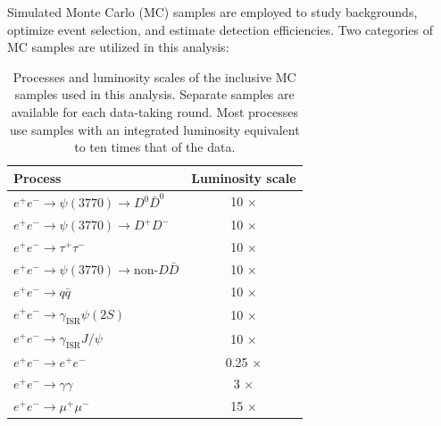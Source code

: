 Simulated Monte Carlo (MC) samples are employed to study backgrounds, optimize event selection, and estimate detection efficiencies. Two categories of MC samples are utilized in this analysis:

\begin{table}[t]
    \begin{center}
        \caption{Processes and luminosity scales of the inclusive MC samples used in this analysis. Separate samples are available for each data-taking round. Most processes use samples with an integrated luminosity equivalent to ten times that of the data.}
        \vspace{4mm}
        \begin{tabular}{l c}
            \hline \hline
            Process                                         & Luminosity scale \\
            \hline
            $e^+e^- \to \psi(3770) \to D^0\bar{D}^0$        & 10 $\times$      \\
            $e^+e^- \to \psi(3770) \to D^+D^-$              & 10 $\times$      \\
            $e^+e^- \to \tau^+\tau^-$                       & 10 $\times$      \\
            $e^+e^- \to \psi(3770) \to \text{non-}D\bar{D}$ & 10 $\times$      \\
            $e^+e^- \to q \bar{q}$                          & 10 $\times$      \\
            $e^+e^- \to \gamma_{\text{ISR}} \psi(2S)$       & 10 $\times$      \\
            $e^+e^- \to \gamma_{\text{ISR}} J/\psi$         & 10 $\times$      \\
            $e^+e^- \to e^+e^-$                             & 0.25 $\times$    \\
            $e^+e^- \to \gamma \gamma$                      & 3 $\times$       \\
            $e^+e^- \to \mu^+\mu^-$                         & 15 $\times$      \\
            \hline \hline
        \end{tabular}
        \label{tab:inclusiveMC_processes}
    \end{center}
\end{table}

